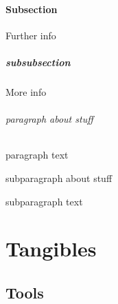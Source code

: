 \documentclass{book}
\begin{document}
\subsection{Subsection}
Further info
\subsubsection{subsubsection}
More info
\paragraph{paragraph about stuff}
paragraph text
\subparagraph{subparagraph about stuff}
subparagraph text

\part{Tangibles}

\chapter{Tools}


\end{document}
